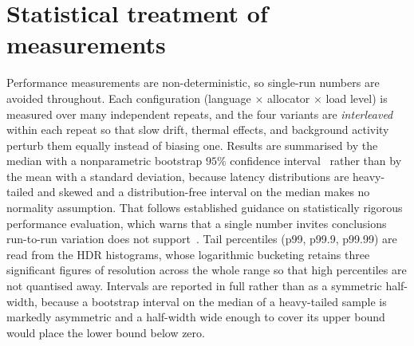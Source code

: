 \section{Statistical treatment of measurements}\label{sec:stats}
Performance measurements are non-deterministic, so single-run numbers are avoided throughout.
Each configuration (language $\times$ allocator $\times$ load level) is measured over many
independent repeats, and the four variants are \emph{interleaved} within each repeat so that
slow drift, thermal effects, and background activity perturb them equally instead of biasing
one. Results are summarised by the median with a nonparametric bootstrap $95\%$ confidence
interval~\cite{efron1993bootstrap} rather than by the mean with a standard deviation, because
latency distributions are heavy-tailed and skewed and a distribution-free interval on the median
makes no normality assumption. That follows established guidance on statistically rigorous
performance evaluation, which warns that a single number invites conclusions run-to-run
variation does not support~\cite{georges2007rigorous}. Tail percentiles (p99, p99.9, p99.99) are
read from the HDR histograms, whose logarithmic bucketing retains three significant figures of
resolution across the whole range so that high percentiles are not quantised away. Intervals are
reported in full rather than as a symmetric half-width, because a bootstrap interval on the
median of a heavy-tailed sample is markedly asymmetric and a half-width wide enough to cover its
upper bound would place the lower bound below zero.

